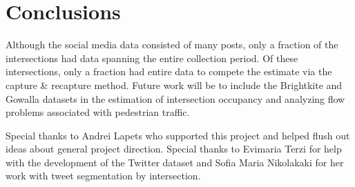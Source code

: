 \documentclass[twocolumn,10pt]{asme2ej}
\begin{document}
\section{Conclusions}
Although the social media data consisted of many posts, only a fraction of the intersections had data spanning the entire collection period. Of these intersections, only a fraction had entire data to compete the estimate via the capture \& recapture method. Future work will be to include the Brightkite and Gowalla datasets in the estimation of intersection occupancy and analyzing flow problems associated with pedestrian traffic.

\begin{acknowledgment}
Special thanks to Andrei Lapets who supported this project and helped flush out ideas about general project direction. Special thanks to Evimaria Terzi for help with the development of the Twitter dataset and Sofia Maria Nikolakaki for her work with tweet segmentation by intersection.
\end{acknowledgment}
\end{document}
